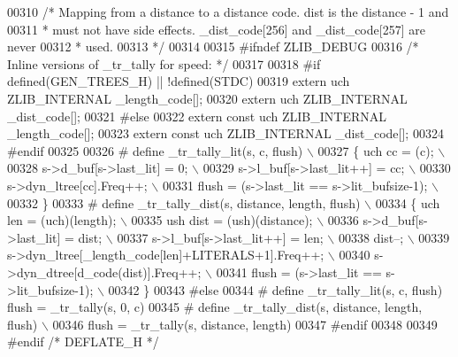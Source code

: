 \begin{DoxyCode}
00310 \textcolor{comment}{/* Mapping from a distance to a distance code. dist is the distance - 1 and}
00311 \textcolor{comment}{ * must not have side effects. \_dist\_code[256] and \_dist\_code[257] are never}
00312 \textcolor{comment}{ * used.}
00313 \textcolor{comment}{ */}
00314 
00315 \textcolor{preprocessor}{#ifndef ZLIB\_DEBUG}
00316 \textcolor{comment}{/* Inline versions of \_tr\_tally for speed: */}
00317 
00318 \textcolor{preprocessor}{#if defined(GEN\_TREES\_H) || !defined(STDC)}
00319   \textcolor{keyword}{extern} uch ZLIB\_INTERNAL \_length\_code[];
00320   \textcolor{keyword}{extern} uch ZLIB\_INTERNAL \_dist\_code[];
00321 \textcolor{preprocessor}{#else}
00322   \textcolor{keyword}{extern} \textcolor{keyword}{const} uch ZLIB\_INTERNAL \_length\_code[];
00323   \textcolor{keyword}{extern} \textcolor{keyword}{const} uch ZLIB\_INTERNAL \_dist\_code[];
00324 \textcolor{preprocessor}{#endif}
00325 
00326 \textcolor{preprocessor}{# define \_tr\_tally\_lit(s, c, flush) \(\backslash\)}
00327 \textcolor{preprocessor}{  \{ uch cc = (c); \(\backslash\)}
00328 \textcolor{preprocessor}{    s->d\_buf[s->last\_lit] = 0; \(\backslash\)}
00329 \textcolor{preprocessor}{    s->l\_buf[s->last\_lit++] = cc; \(\backslash\)}
00330 \textcolor{preprocessor}{    s->dyn\_ltree[cc].Freq++; \(\backslash\)}
00331 \textcolor{preprocessor}{    flush = (s->last\_lit == s->lit\_bufsize-1); \(\backslash\)}
00332 \textcolor{preprocessor}{   \}}
00333 \textcolor{preprocessor}{# define \_tr\_tally\_dist(s, distance, length, flush) \(\backslash\)}
00334 \textcolor{preprocessor}{  \{ uch len = (uch)(length); \(\backslash\)}
00335 \textcolor{preprocessor}{    ush dist = (ush)(distance); \(\backslash\)}
00336 \textcolor{preprocessor}{    s->d\_buf[s->last\_lit] = dist; \(\backslash\)}
00337 \textcolor{preprocessor}{    s->l\_buf[s->last\_lit++] = len; \(\backslash\)}
00338 \textcolor{preprocessor}{    dist--; \(\backslash\)}
00339 \textcolor{preprocessor}{    s->dyn\_ltree[\_length\_code[len]+LITERALS+1].Freq++; \(\backslash\)}
00340 \textcolor{preprocessor}{    s->dyn\_dtree[d\_code(dist)].Freq++; \(\backslash\)}
00341 \textcolor{preprocessor}{    flush = (s->last\_lit == s->lit\_bufsize-1); \(\backslash\)}
00342 \textcolor{preprocessor}{  \}}
00343 \textcolor{preprocessor}{#else}
00344 \textcolor{preprocessor}{# define \_tr\_tally\_lit(s, c, flush) flush = \_tr\_tally(s, 0, c)}
00345 \textcolor{preprocessor}{# define \_tr\_tally\_dist(s, distance, length, flush) \(\backslash\)}
00346 \textcolor{preprocessor}{              flush = \_tr\_tally(s, distance, length)}
00347 \textcolor{preprocessor}{#endif}
00348 
00349 \textcolor{preprocessor}{#endif }\textcolor{comment}{/* DEFLATE\_H */}\textcolor{preprocessor}{}
\end{DoxyCode}
